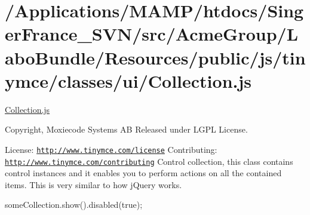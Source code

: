 \hypertarget{_2_applications_2_m_a_m_p_2htdocs_2_singer_france__s_v_n_2src_2_acme_group_2_labo_bundle_2_resou1a5ca228b88a6949fd83cecc41d11b07}{\section{/\+Applications/\+M\+A\+M\+P/htdocs/\+Singer\+France\+\_\+\+S\+V\+N/src/\+Acme\+Group/\+Labo\+Bundle/\+Resources/public/js/tinymce/classes/ui/\+Collection.\+js}
}
\hyperlink{_collection_8js}{Collection.\+js}

Copyright, Moxiecode Systems A\+B Released under L\+G\+P\+L License.

License\+: \href{http://www.tinymce.com/license}{\tt http\+://www.\+tinymce.\+com/license} Contributing\+: \href{http://www.tinymce.com/contributing}{\tt http\+://www.\+tinymce.\+com/contributing} Control collection, this class contains control instances and it enables you to perform actions on all the contained items. This is very similar to how j\+Query works.

some\+Collection.\+show().disabled(true);


\begin{DoxyCodeInclude}
\end{DoxyCodeInclude}
 